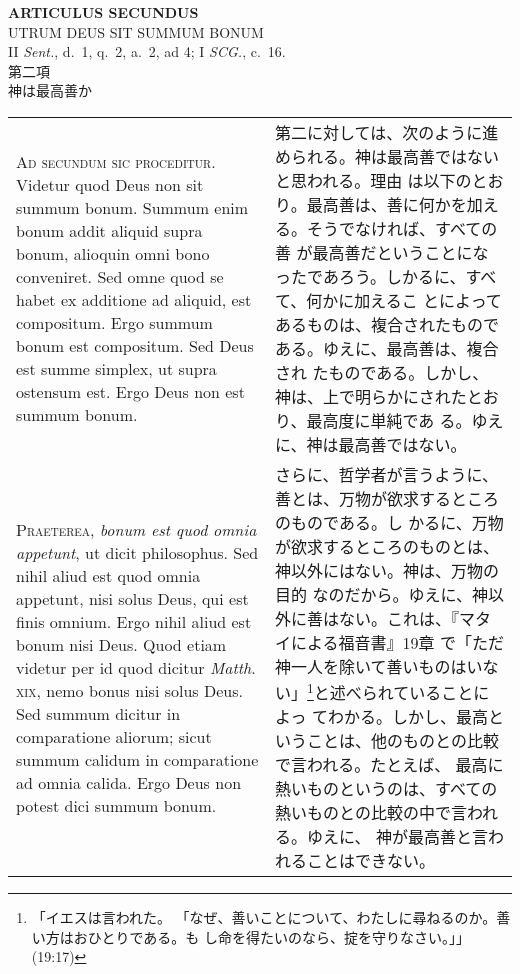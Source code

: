 \documentclass[10pt]{jsarticle} %
\begin{document}
\newpage
{}

\begin{center}
 {\Large {\bf ARTICULUS SECUNDUS}}\\
 {\large UTRUM DEUS SIT SUMMUM BONUM}\\
 {\footnotesize II {\itshape Sent.}, d.~1, q.~2, a.~2, ad 4; I {\itshape
 SCG.}, c.~16.}\\
 {\Large 第二項\\神は最高善か}
\end{center}

\begin{longtable}{p{21em}p{21em}}

{\huge A}{\scshape d secundum sic proceditur}. Videtur quod Deus non sit summum
 bonum. Summum enim bonum addit aliquid supra bonum, alioquin omni bono
 conveniret. Sed omne quod se habet ex additione ad aliquid, est
 compositum. Ergo summum bonum est compositum. Sed Deus est summe
 simplex, ut supra ostensum est. Ergo Deus non est summum bonum.

&


第二に対しては、次のように進められる。神は最高善ではないと思われる。理由
 は以下のとおり。最高善は、善に何かを加える。そうでなければ、すべての善
 が最高善だということになったであろう。しかるに、すべて、何かに加えるこ
 とによってあるものは、複合されたものである。ゆえに、最高善は、複合され
 たものである。しかし、神は、上で明らかにされたとおり、最高度に単純であ
 る。ゆえに、神は最高善ではない。


\\

{\scshape Praeterea}, {\itshape bonum est quod omnia appetunt}, ut dicit
 philosophus. Sed nihil aliud est quod omnia appetunt, nisi solus Deus,
 qui est finis omnium. Ergo nihil aliud est bonum nisi Deus. Quod etiam
 videtur per id quod dicitur {\itshape Matth}. {\scshape xix}, nemo
 bonus nisi solus Deus. Sed summum dicitur in comparatione aliorum;
 sicut summum calidum in comparatione ad omnia calida. Ergo Deus non
 potest dici summum bonum.

&


さらに、哲学者が言うように、善とは、万物が欲求するところのものである。し
 かるに、万物が欲求するところのものとは、神以外にはない。神は、万物の目的
 なのだから。ゆえに、神以外に善はない。これは、『マタイによる福音書』19章
 で「ただ神一人を除いて善いものはいない」\footnote{「イエスは言われた。
 「なぜ、善いことについて、わたしに尋ねるのか。善い方はおひとりである。も
 し命を得たいのなら、掟を守りなさい。」」(19:17)}と述べられていることによっ
 てわかる。しかし、最高ということは、他のものとの比較で言われる。たとえば、
 最高に熱いものというのは、すべての熱いものとの比較の中で言われる。ゆえに、
 神が最高善と言われることはできない。



\end{longtable}
\end{document}
